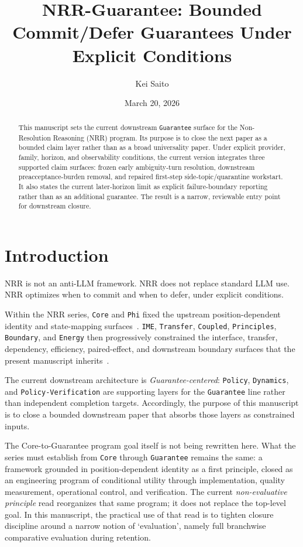 \documentclass[11pt]{article}
\title{NRR-Guarantee: Bounded Commit/Defer Guarantees Under Explicit Conditions}
\author{Kei Saito}
\date{March 20, 2026}
\begin{document}
\maketitle

\begin{abstract}
This manuscript sets the current downstream \texttt{Guarantee} surface for the
Non-Resolution Reasoning (NRR) program. Its purpose is to close the next paper
as a bounded claim layer rather than as a broad universality paper. Under
explicit provider, family, horizon, and observability conditions, the current
version integrates three supported claim surfaces: frozen early ambiguity-turn
resolution, downstream preacceptance-burden removal, and repaired first-step
side-topic/quarantine workstart. It also states the current later-horizon limit
as explicit failure-boundary reporting rather than as an additional guarantee.
The result is a narrow, reviewable entry point for downstream closure.
\end{abstract}

\section{Introduction}

NRR is not an anti-LLM framework. NRR does not replace standard LLM use. NRR
optimizes when to commit and when to defer, under explicit conditions.

Within the NRR series, \texttt{Core} and \texttt{Phi} fixed the upstream
position-dependent identity and state-mapping surfaces~\cite{saito2025nrr,saito2026phi}.
\texttt{IME}, \texttt{Transfer}, \texttt{Coupled}, \texttt{Principles},
\texttt{Boundary}, and \texttt{Energy} then progressively constrained the
interface, transfer, dependency, efficiency, paired-effect, and downstream
boundary surfaces that the present manuscript inherits~\cite{saito2026ime,saito2026transfer,saito2026coupled,saito2026principles,saito2026boundary,saito2026energy}.

The current downstream architecture is \textit{Guarantee-centered}: \texttt{Policy},
\texttt{Dynamics}, and \texttt{Policy-Verification} are supporting layers for the
\texttt{Guarantee} line rather than independent completion targets. Accordingly, the
purpose of this manuscript is to close a bounded downstream paper that absorbs those
layers as constrained inputs.

The Core-to-Guarantee program goal itself is not being rewritten here. What the
series must establish from \texttt{Core} through \texttt{Guarantee} remains the
same: a framework grounded in position-dependent identity as a first principle,
closed as an engineering program of conditional utility through
implementation, quality measurement, operational control, and verification. The
current \textit{non-evaluative principle} read reorganizes that same program; it
does not replace the top-level goal. In this manuscript, the practical use of
that read is to tighten closure discipline around a narrow notion of
`evaluation', namely full branchwise comparative evaluation during retention.
\end{document}
